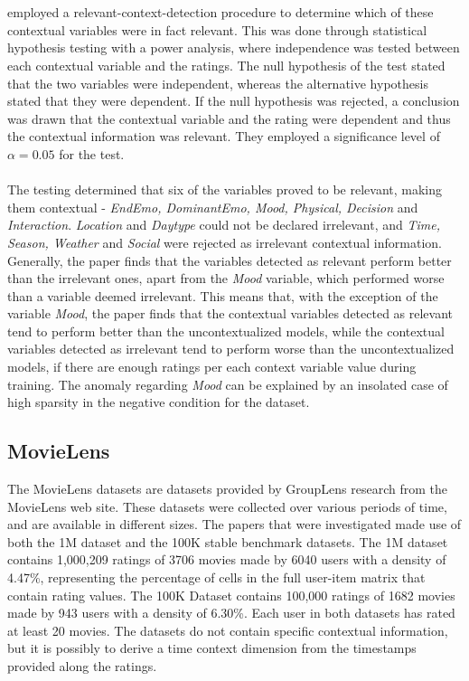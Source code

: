 \\\\
\cite{COMODA2013} employed a relevant-context-detection procedure to determine which of these contextual variables were in fact relevant.
This was done through statistical hypothesis testing with a power analysis, where independence was tested between each contextual variable and the ratings.
The null hypothesis of the test stated that the two variables were independent, whereas the alternative hypothesis stated that they were dependent.
If the null hypothesis was rejected, a conclusion was drawn that the contextual variable and the rating were dependent and thus the contextual information was relevant.
They employed a significance level of $\alpha = 0.05$ for the test.
\\\\
The testing determined that six of the variables proved to be relevant, making them contextual - \textit{EndEmo, DominantEmo, Mood, Physical, Decision} and \textit{Interaction}.
\textit{Location} and \textit{Daytype} could not be declared irrelevant, and \textit{Time, Season, Weather} and \textit{Social} were rejected as irrelevant contextual information.
Generally, the paper finds that the variables detected as relevant perform better than the irrelevant ones, apart from the \textit{Mood} variable, which performed worse than a variable deemed irrelevant.
This means that, with the exception of the variable \textit{Mood}, the paper finds that the contextual variables detected as relevant tend to perform better than the uncontextualized models, while the contextual variables detected as irrelevant tend to perform worse than the uncontextualized models, if there are enough ratings per each context variable value during training.
The anomaly regarding \textit{Mood} can be explained by an insolated case of high sparsity in the negative condition for the dataset.

\subsection{MovieLens}
The MovieLens datasets are datasets provided by GroupLens research from the MovieLens web site.
These datasets were collected over various periods of time, and are available in different sizes\cite{movielens}.
The papers that were investigated made use of both the 1M dataset and the 100K stable benchmark datasets.
The 1M dataset contains 1,000,209 ratings of 3706 movies made by 6040 users with a density of 4.47\%, representing the percentage of cells in the full user-item matrix that contain rating values\cite{MovieLens2015}.
The 100K Dataset contains 100,000 ratings of 1682 movies made by 943 users with a density of 6.30\%\cite{MovieLens2015}.
Each user in both datasets has rated at least 20 movies.
The datasets do not contain specific contextual information, but it is possibly to derive a time context dimension from the timestamps provided along the ratings.

